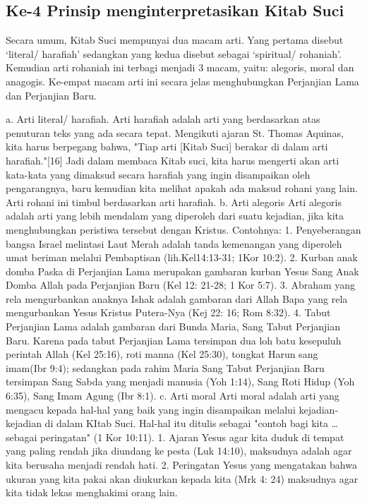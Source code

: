 \subsection{Ke-4 Prinsip menginterpretasikan Kitab Suci}
Secara umum, Kitab Suci mempunyai dua macam arti. Yang pertama disebut ‘literal/ harafiah’ sedangkan yang kedua disebut sebagai ‘spiritual/ rohaniah’. Kemudian arti rohaniah ini terbagi menjadi 3 macam, yaitu: alegoris, moral dan anagogis. Ke-empat macam arti ini secara jelas menghubungkan Perjanjian Lama dan Perjanjian Baru.


a. Arti literal/ harafiah.
Arti harafiah adalah arti yang berdasarkan atas penuturan teks yang ada secara tepat. Mengikuti ajaran St. Thomas Aquinas, kita harus berpegang bahwa, "Tiap arti [Kitab Suci] berakar di dalam arti harafiah."[16] Jadi dalam membaca Kitab suci, kita harus mengerti akan arti kata-kata yang dimaksud secara harafiah yang ingin disampaikan oleh pengarangnya, baru kemudian kita melihat apakah ada maksud rohani yang lain. Arti rohani ini timbul berdasarkan arti harafiah.
b. Arti alegoris
Arti alegoris adalah arti yang lebih mendalam yang diperoleh dari suatu kejadian, jika kita menghubungkan peristiwa tersebut dengan Kristus. Contohnya:
1.    Penyeberangan bangsa Israel melintasi Laut Merah adalah tanda kemenangan yang diperoleh umat beriman melalui Pembaptisan (lih.Kel14:13-31; 1Kor 10:2).
2.    Kurban anak domba Paska di Perjanjian Lama merupakan gambaran kurban Yesus Sang Anak Domba Allah pada Perjanjian Baru (Kel 12: 21-28; 1 Kor 5:7).
3.    Abraham yang rela mengurbankan anaknya Ishak adalah gambaran dari Allah Bapa yang rela mengurbankan Yesus Kristus Putera-Nya (Kej 22: 16; Rom 8:32).
4.    Tabut Perjanjian Lama adalah gambaran dari Bunda Maria, Sang Tabut Perjanjian Baru. Karena pada tabut Perjanjian Lama tersimpan dua loh batu kesepuluh perintah Allah (Kel 25:16), roti manna (Kel 25:30), tongkat Harun sang imam(Ibr 9:4); sedangkan pada rahim Maria Sang Tabut Perjanjian Baru tersimpan Sang Sabda yang menjadi manusia (Yoh 1:14), Sang Roti Hidup (Yoh 6:35), Sang Imam Agung (Ibr 8:1).
c. Arti moral
Arti moral adalah arti yang mengacu kepada hal-hal yang baik yang ingin disampaikan melalui kejadian- kejadian di dalam KItab Suci. Hal-hal itu ditulis sebagai "contoh bagi kita \dots sebagai peringatan" (1 Kor 10:11).
1.    Ajaran Yesus agar kita duduk di tempat yang paling rendah jika diundang ke pesta (Luk 14:10), maksudnya adalah agar kita berusaha menjadi rendah hati.
2.    Peringatan Yesus yang mengatakan bahwa ukuran yang kita pakai akan diukurkan kepada kita (Mrk 4: 24) maksudnya agar kita tidak lekas menghakimi orang lain.
